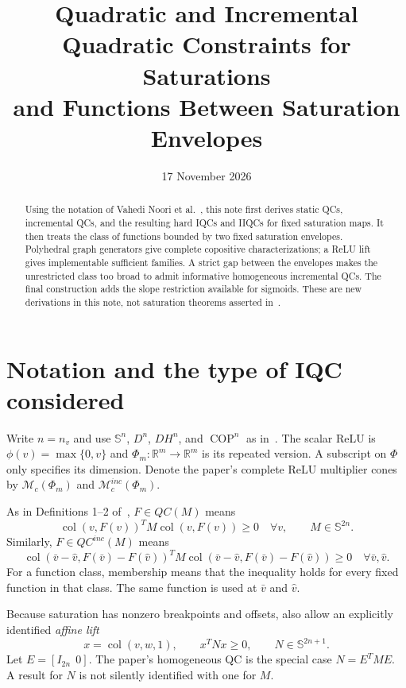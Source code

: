 \documentclass[10pt,a4paper]{article}
\title{Quadratic and Incremental Quadratic Constraints for Saturations\texorpdfstring{\\}{ }and Functions Between Saturation Envelopes}
\author{}
\date{17 November 2026}
\theoremstyle{definition}
\theoremstyle{remark}
\newcommand{\R}{\mathbb R}
\newcommand{\Ss}{\mathbb S}
\newcommand{\COP}{\operatorname{COP}}
\newcommand{\col}{\operatorname{col}}
\newcommand{\mc}{\mathcal M_c}
\begin{document}
\maketitle

\begin{abstract}
Using the notation of Vahedi Noori et al.~\cite{relu}, this note first derives static QCs, incremental QCs, and the resulting hard IQCs and IIQCs for fixed saturation maps. It then treats the class of functions bounded by two fixed saturation envelopes. Polyhedral graph generators give complete copositive characterizations; a ReLU lift gives implementable sufficient families. A strict gap between the envelopes makes the unrestricted class too broad to admit informative homogeneous incremental QCs. The final construction adds the slope restriction available for sigmoids. These are new derivations in this note, not saturation theorems asserted in~\cite{relu}.
\end{abstract}

\section{Notation and the type of IQC considered}
Write $n=n_v$ and use $\Ss^n$, $D^n$, $DH^n$, and $\COP^n$ as in~\cite{relu}. The scalar ReLU is $\phi(v)=\max\{0,v\}$ and $\Phi_m:\R^m\to\R^m$ is its repeated version. A subscript on $\Phi$ only specifies its dimension. Denote the paper's complete ReLU multiplier cones by $\mc(\Phi_m)$ and $\mc^{inc}(\Phi_m)$.

As in Definitions 1--2 of~\cite{relu}, $F\in QC(M)$ means
\begin{equation}\label{eq:qc}
 \col(v,F(v))^T M\col(v,F(v))\ge0\quad\forall v,
 \qquad M\in\Ss^{2n}.
\end{equation}
Similarly, $F\in QC^{inc}(M)$ means
\begin{equation}\label{eq:incqc}
 \col(\bar v-\hat v,F(\bar v)-F(\hat v))^T M
 \col(\bar v-\hat v,F(\bar v)-F(\hat v))\ge0
 \quad\forall\bar v,\hat v.
\end{equation}
For a function class, membership means that the inequality holds for every fixed function in that class. The same function is used at $\bar v$ and $\hat v$.

Because saturation has nonzero breakpoints and offsets, also allow an explicitly identified \emph{affine lift}
\begin{equation}\label{eq:affqc}
 x=\col(v,w,1),\qquad x^TNx\ge0,\qquad N\in\Ss^{2n+1}.
\end{equation}
Let $E=[I_{2n}\ \ 0]$. The paper's homogeneous QC is the special case $N=E^TME$. A result for $N$ is not silently identified with one for $M$.
\end{document}
